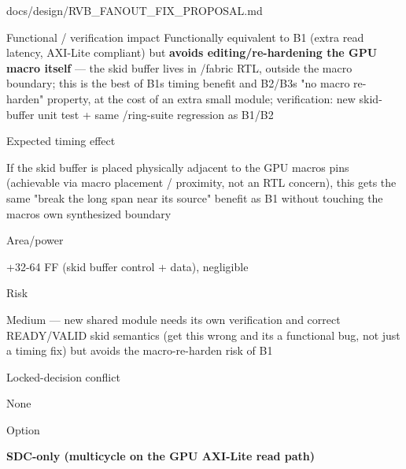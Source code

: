 \begin{relocated}{docs/design/RVB_FANOUT_FIX_PROPOSAL.md}
\begin{rowtable}
\begin{rowcell}{Functional / verification impact}
Functionally equivalent to B1 (extra read latency, AXI-Lite compliant)
but \textbf{avoids editing/\allowbreak{}re-hardening the GPU macro
itself} --- the skid buffer lives in /fabric RTL,
outside the macro boundary; this is the best of B1\textquotesingle s
timing benefit and B2/B3\textquotesingle s "no macro re-harden"
property, at the cost of an extra small module; verification: new
skid-buffer unit test + same /\allowbreak{}ring-suite
regression as B1/B2

\end{rowcell}

\begin{rowcell}{Expected timing effect}

If the skid buffer is placed physically adjacent to the GPU
macro\textquotesingle s pins (achievable via macro placement /
 proximity, not an RTL concern),
this gets the same "break the long span near its source" benefit as B1
without touching the macro\textquotesingle s own synthesized boundary

\end{rowcell}

\begin{rowcell}{Area/\allowbreak{}power}

+32-64 FF (skid buffer control + data), negligible

\end{rowcell}

\begin{rowcell}{Risk}

Medium --- new shared module needs its own verification and correct
READY/\allowbreak{}VALID skid semantics (get this wrong and
it\textquotesingle s a functional bug, not just a timing fix) but avoids
the macro-re-harden risk of B1

\end{rowcell}

\begin{rowcell}{Locked-decision conflict}

None

\end{rowcell}


\begin{rowcell}{Option}

\textbf{SDC-only (multicycle on the GPU AXI-Lite read path)}

\end{rowcell}


\end{rowtable}
\end{relocated}
